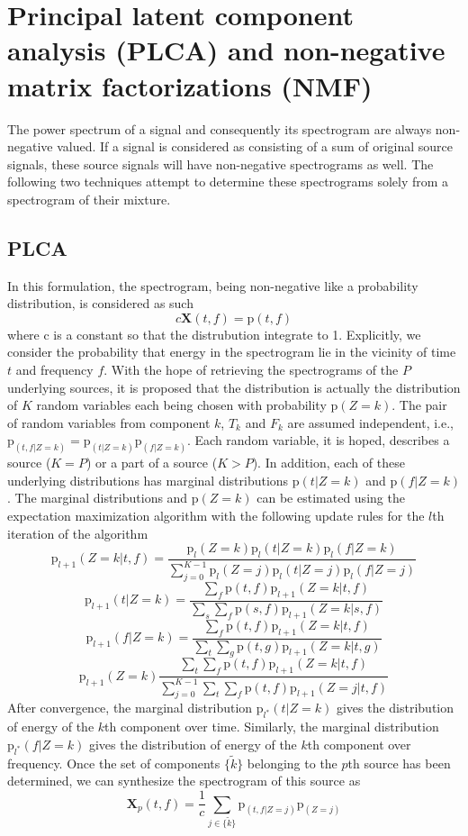 \section{Principal latent component analysis (PLCA) and non-negative matrix
factorizations (NMF)}

The power spectrum of a signal and consequently its spectrogram are always
non-negative valued. If a signal is considered as consisting of a sum of
original source signals, these source signals will have non-negative
spectrograms as well. The following two techniques attempt to determine these
spectrograms solely from a spectrogram of their mixture.

\subsection{PLCA}

In this formulation, the spectrogram, being non-negative like a probability
distribution, is considered as such
\[
    c\boldsymbol{X}(t,f) = \mathrm{p} (t,f)
\]
where c is a constant so that the distrubution integrate to 1. Explicitly,
we consider the probability that energy in the spectrogram lie in the vicinity
of time $t$ and frequency $f$. With the hope of retrieving the spectrograms of
the $P$ underlying sources, it is proposed
that the distribution is actually the distribution of $K$ random variables each
being chosen with probability $\mathrm{p}(Z=k)$. The pair of random variables
from component $k$, $T_{k}$ and $F_{k}$ are assumed independent, i.e.,
$\mathrm{p}_(t,f|Z=k)=\mathrm{p}_(t|Z=k)\mathrm{p}_(f|Z=k)$. Each random variable, it is
hoped, describes a source ($K=P$) or a part of a source ($K>P$). In addition,
each of these underlying distributions has marginal distributions $\mathrm{p}(t
| Z=k)$ and $\mathrm{p}(f | Z=k)$. The marginal distributions and
$\mathrm{p}(Z=k)$ can be estimated using the expectation maximization
algorithm
with the following update rules for the $l$th iteration of the
algorithm \cite{smaragdis2006probabilistic}
\[
    \mathrm{p}_{l+1}(Z=k | t, f)
    =
    \frac{\mathrm{p}_{l}(Z=k)\mathrm{p}_{l}(t|Z=k)\mathrm{p}_{l}(f|Z=k)}
    {\sum_{j=0}^{K-1}{\mathrm{p}_{l}(Z=j)\mathrm{p}_{l}(t|Z=j)\mathrm{p}_{l}(f|Z=j)}}
\]
\[
    \mathrm{p}_{l+1}(t|Z=k)
    =
    \frac{\sum_{f}\mathrm{p}(t,f)\mathrm{p}_{l+1}(Z=k|t,f)}
    {\sum_{s}\sum_{f}\mathrm{p}(s,f)\mathrm{p}_{l+1}(Z=k|s,f)}
\]
\[
    \mathrm{p}_{l+1}(f|Z=k)
    =
    \frac{\sum_{f}\mathrm{p}(t,f)\mathrm{p}_{l+1}(Z=k|t,f)}
    {\sum_{t}\sum_{g}\mathrm{p}(t,g)\mathrm{p}_{l+1}(Z=k|t,g)}
\]
\[
    \mathrm{p}_{l+1}(Z=k)
    \frac{\sum_{t}\sum_{f}\mathrm{p}(t,f)\mathrm{p}_{l+1}(Z=k|t,f)}
    {\sum_{j=0}^{K-1}\sum_{t}\sum_{f}\mathrm{p}(t,f)\mathrm{p}_{l+1}(Z=j|t,f)}
\]
After convergence, the marginal distribution $\mathrm{p}_{l^{\ast}}(t|Z=k)$
gives the distribution of energy of the $k$th component over time. Similarly, 
the marginal distribution $\mathrm{p}_{l^{\ast}}(f|Z=k)$
gives the distribution of energy of the $k$th component over frequency. Once the
set of components $\{ \tilde{k} \}$ belonging to the $p$th source has been
determined, we can synthesize the spectrogram of this source as
\[
    \boldsymbol{X}_{p}(t,f) = \frac{1}{c}
    \sum_{j \in \{\tilde{k}\}}\mathrm{p}_(t,f|Z=j)\mathrm{p}_(Z=j)
\]


